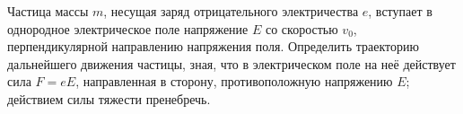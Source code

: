 Частица массы $m$, несущая заряд отрицательного электричества $e$, вступает в однородное электрическое поле напряжение $E$
со скоростью $v_{0}$, перпендикулярной направлению напряжения поля. Определить траекторию дальнейшего движения частицы,
зная, что в электрическом поле на неё действует сила $F=eE$, направленная в сторону, противоположную напряжению $E$;
действием силы тяжести пренебречь.
